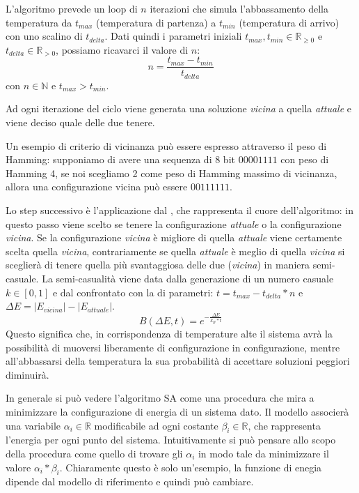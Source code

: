 L'algoritmo prevede un loop di $n$ iterazioni che simula l'abbassamento della temperatura da $t_{max}$ (temperatura di partenza) a $t_{min}$ (temperatura di arrivo) con uno scalino di $t_{delta}$. Dati quindi i parametri iniziali $t_{max}, t_{min} \in \mathbb{R}_{\geq 0}$ e $ t_{delta} \in \mathbb{R}_{> 0}$, possiamo ricavarci il valore di $n$:
$$n = \frac{t_{max}-t_{min}}{t_{delta}}$$
con $n \in \mathbb{N}$ e $t_{max} > t_{min}$.

Ad ogni iterazione del ciclo viene generata una soluzione \textit{vicina} a quella \textit{attuale} e viene deciso quale delle due tenere.

Un esempio di criterio di vicinanza può essere espresso attraverso il peso di Hamming: supponiamo di avere una sequenza di 8 bit $00001111$ con peso di Hamming 4, se noi scegliamo 2 come peso di Hamming massimo di vicinanza, allora una configurazione vicina può essere $00111111$.

Lo step successivo è l'applicazione dal , che rappresenta il cuore dell'algoritmo: in questo passo viene scelto se tenere la configurazione \textit{attuale} o la configurazione \textit{vicina}. Se la configurazione \textit{vicina} è migliore di quella \textit{attuale} viene certamente scelta quella \textit{vicina}, contrariamente se quella \textit{attuale} è meglio di quella \textit{vicina} si sceglierà di tenere quella più svantaggiosa delle due (\textit{vicina}) in maniera semi-casuale.
La semi-casualità viene data dalla generazione di un numero casuale $k \in [0,1]$ e dal confrontato con la  di parametri: $t = t_{max} - t_{delta} * n$ e $\Delta E = |E_{vicina}| - |E_{attuale}|$.
$$B(\Delta E, t) = e^{- \frac{\Delta E}{k_B * t}}$$
Questo significa che, in corrispondenza di temperature alte il sistema avrà la possibilità di muoversi liberamente di configurazione in configurazione, mentre all’abbassarsi della temperatura la sua probabilità di accettare soluzioni peggiori diminuirà.

In generale si può vedere l'algoritmo SA come una procedura che mira a minimizzare la configurazione di energia di un sistema dato. Il modello associerà una variabile $\alpha_i \in \mathbb{R}$ modificabile ad ogni costante $\beta_i \in \mathbb{R}$, che rappresenta l'energia per ogni punto del sistema. Intuitivamente si può pensare allo scopo della procedura come quello di trovare gli $\alpha_i$ in modo tale da minimizzare il valore $\alpha_i * \beta_i$. Chiaramente questo è solo un'esempio, la funzione di enegia dipende dal modello di riferimento e quindi può cambiare.

